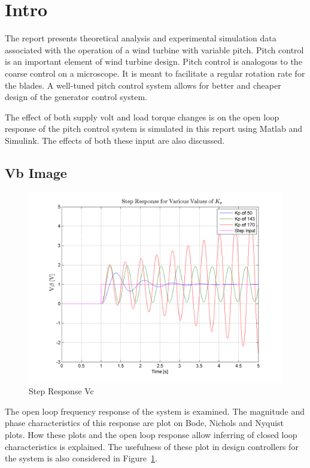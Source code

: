 \documentclass{article}
\begin{document}
 \section{Intro}

The report presents theoretical analysis and experimental simulation data associated with the operation of a wind turbine with variable pitch. Pitch control is an important element of wind turbine design. Pitch control is analogous to the coarse control on a microscope. It is meant to facilitate a regular rotation rate for the blades. A well-tuned pitch control system allows for better and cheaper design of the generator control system. 

The effect of both supply volt and load torque changes is on the open loop response of the pitch control system is simulated in this report using Matlab and Simulink. The effects of both these input are also discussed.

\subsection{Vb Image}

\begin{figure}[htp]
\includegraphics{../img/StepResponseVb}
\caption{Step Response Vc}
\label{VbStep}
\end{figure}

The open loop frequency response of the system is examined. The magnitude and phase characteristics of this response are plot on Bode, Nichols and Nyquist plots. How these plots and the open loop response allow inferring of closed loop characteristics is explained. The usefulness of these plot in design controllers for the system is also considered in Figure~\ref{VbStep}.
\end{document}
